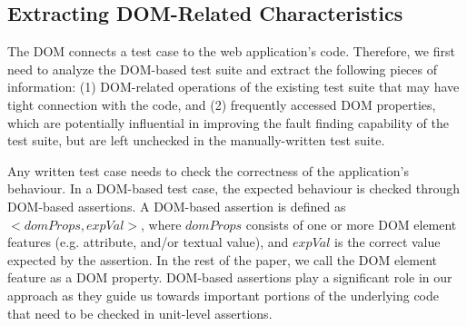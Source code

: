 \subsection{Extracting DOM-Related Characteristics} \label{Sec:extractDomRelatedInfo}
The DOM connects a test case to the web application's code. Therefore, we first need to analyze the DOM-based test suite and extract the following pieces of information: (1) DOM-related operations of the existing test suite that may have tight connection with the \javascript code, and (2) frequently accessed DOM properties, which are potentially influential in improving the fault finding capability of the test suite, but are left unchecked in the manually-written test suite.

Any written test case needs to check the correctness of the application's behaviour. In a DOM-based test case, the expected behaviour is checked through DOM-based assertions. A
DOM-based assertion is defined as $<domProps,expVal>$, where $domProps$ consists of one or more DOM element features (e.g. attribute, and/or textual value), and $expVal$ is the correct value expected by the assertion. In the rest of the paper, we call the DOM element feature as a DOM property. 
DOM-based assertions play a significant role in our approach as they guide us towards important portions of the underlying \javascript code that need to be checked in unit-level assertions.

